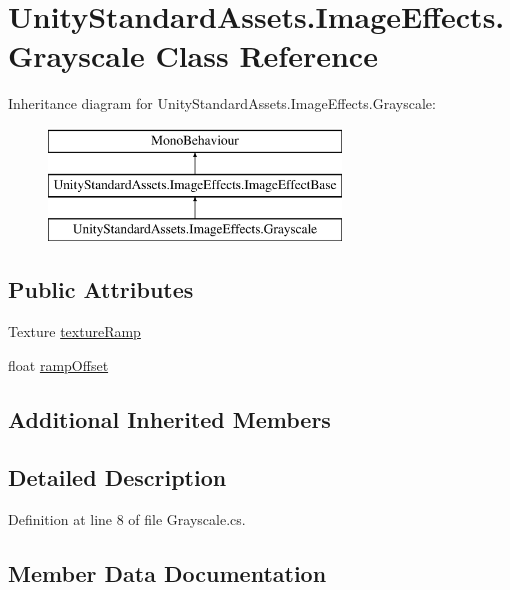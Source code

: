 \hypertarget{class_unity_standard_assets_1_1_image_effects_1_1_grayscale}{}\section{Unity\+Standard\+Assets.\+Image\+Effects.\+Grayscale Class Reference}
\label{class_unity_standard_assets_1_1_image_effects_1_1_grayscale}
Inheritance diagram for Unity\+Standard\+Assets.\+Image\+Effects.\+Grayscale\+:\begin{figure}[H]
\begin{center}
\leavevmode
\includegraphics[height=3.000000cm]{class_unity_standard_assets_1_1_image_effects_1_1_grayscale}
\end{center}
\end{figure}
\subsection*{Public Attributes}
\begin{DoxyCompactItemize}
\item 
Texture \mbox{\hyperlink{class_unity_standard_assets_1_1_image_effects_1_1_grayscale_a0eb120d0884c76cd7c0a7e2c0d455c37}{texture\+Ramp}}
\item 
float \mbox{\hyperlink{class_unity_standard_assets_1_1_image_effects_1_1_grayscale_a313d99a0ce13e7f58f5694f83d8cae0e}{ramp\+Offset}}
\end{DoxyCompactItemize}
\subsection*{Additional Inherited Members}


\subsection{Detailed Description}


Definition at line 8 of file Grayscale.\+cs.



\subsection{Member Data Documentation}
\mbox{\label{class_unity_standard_assets_1_1_image_effects_1_1_grayscale_a313d99a0ce13e7f58f5694f83d8cae0e}} 
